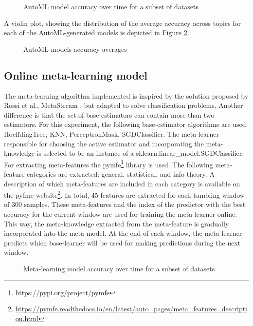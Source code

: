 \documentclass{sig-alternate-br}
\begin{document}
\begin{figure}[h!]
\centering 
{}
\caption{AutoML model accuracy over time for a subset of datasets}
\label{fig:automl_tpot}
\end{figure}

\vspace{2cm}
A violin plot, showing the distribution of the average accuracy across topics for each of the AutoML-generated models is depicted in Figure \ref{fig:automl_violin}.

\begin{figure}[h!]
\centering 
{}
\caption{AutoML models accuracy averages}
\label{fig:automl_violin}
\end{figure}

\subsection{Online meta-learning model}

The meta-learning algorithm implemented is inspired by the solution proposed by Rossi et al., MetaStream \cite{rossi2014metastream}, but adapted to solve classification problems. Another difference is that the set of base-estimators can contain more than two estimators. For this experiment, the following base-estimator algorithms are used: HoeffdingTree, KNN, PerceptronMask, SGDClassifier. The meta-learner responsible for choosing the active estimator and incorporating the meta-knowledge is selected to be an instance of a sklearn.linear\_model.SGDClassifier. For extracting meta-features the pymfe\footnote{\url{https://pypi.org/project/pymfe}} library is used. The following meta-feature categories are extracted: general, statistical, and info-theory. A description of which meta-features are included in each category is available on the pyfme website\footnote{\url{https://pymfe.readthedocs.io/en/latest/auto_pages/meta_features_description.html}}. In total, 45 features are extracted for each tumbling window of 300 samples. These meta-features and the index of the predictor with the best accuracy for the current window are used for training the meta-learner online. This way, the meta-knowledge extracted from the meta-feature is gradually incorporated into the meta-model. At the end of each window, the meta-learner predicts which base-learner will be used for making predictions during the next window. 

\begin{figure}[h]
\centering 
{}
\caption{Meta-learning model accuracy over time for a subset of datasets}
\label{fig:meta}
\end{figure}
\end{document}
